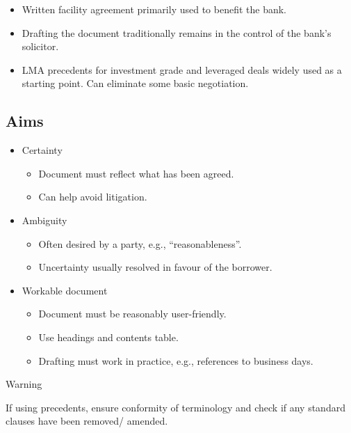 \documentclass[
]{article}
\providecommand{\tightlist}{%
  \setlength{\itemsep}{0pt}\setlength{\parskip}{0pt}}
\newenvironment{env-9a8b2d5a-e80b-4017-bd60-2afb8ee62329}
{
    \savenotes\tcolorbox[blanker,breakable,left=5pt,borderline west={2pt}{-4pt}{orange}]
}
{
    \endtcolorbox\spewnotes
}
\begin{document}
\begin{itemize}
\tightlist
\item
  Written facility agreement primarily used to benefit the bank.
\item
  Drafting the document traditionally remains in the control of the
  bank's solicitor.
\item
  LMA precedents for investment grade and leveraged deals widely used as
  a starting point. Can eliminate some basic negotiation.
\end{itemize}

\hypertarget{aims}{%
\subsection{Aims}\label{aims}}

\begin{itemize}
\tightlist
\item
  Certainty

  \begin{itemize}
  \tightlist
  \item
    Document must reflect what has been agreed.
  \item
    Can help avoid litigation.
  \end{itemize}
\item
  Ambiguity

  \begin{itemize}
  \tightlist
  \item
    Often desired by a party, e.g., ``reasonableness''.
  \item
    Uncertainty usually resolved in favour of the borrower.
  \end{itemize}
\item
  Workable document

  \begin{itemize}
  \tightlist
  \item
    Document must be reasonably user-friendly.
  \item
    Use headings and contents table.
  \item
    Drafting must work in practice, e.g., references to business days.
  \end{itemize}
\end{itemize}

\begin{env-9a8b2d5a-e80b-4017-bd60-2afb8ee62329}

Warning

If using precedents, ensure conformity of terminology and check if any
standard clauses have been removed/ amended.

\end{env-9a8b2d5a-e80b-4017-bd60-2afb8ee62329}
\end{document}
